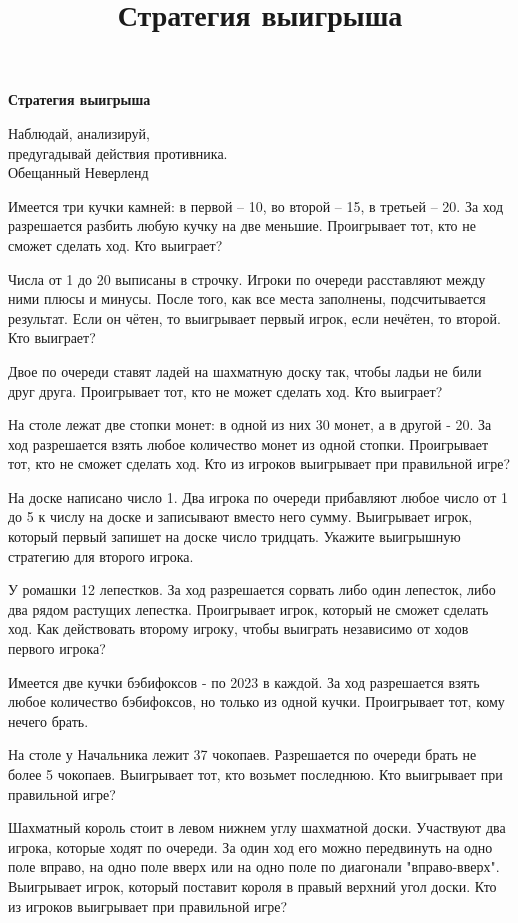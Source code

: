 \centerline{\bf \Huge Стратегия выигрыша}
\title{Стратегия выигрыша}

\begin{flushright}
    \scriptsize Наблюдай, анализируй,\\ предугадывай действия противника.\\
    Обещанный Неверленд
\end{flushright}

Имеется три кучки камней: в первой – 10, во второй – 15, в третьей – 20. За ход разрешается разбить любую кучку на две меньшие. Проигрывает тот, кто не сможет сделать ход. Кто выиграет?

Числа от 1 до 20 выписаны в строчку. Игроки по очереди расставляют между ними плюсы и минусы. После того, как все места заполнены, подсчитывается результат. Если он чётен, то выигрывает первый игрок, если нечётен, то второй. Кто выиграет?

 Двое по очереди ставят ладей на шахматную доску так, чтобы ладьи не били друг друга. Проигрывает тот, кто не может сделать ход. Кто выиграет?

 На столе лежат две стопки монет: в одной из них 30 монет, а в другой - 20. За ход разрешается взять любое количество монет из одной стопки. Проигрывает тот, кто не сможет сделать ход. Кто из игроков выигрывает при правильной игре?

На доске написано число 1. Два игрока по очереди прибавляют любое число от 1 до 5 к числу на доске и записывают вместо него сумму. Выигрывает игрок, который первый запишет на доске число тридцать. Укажите выигрышную стратегию для второго игрока.

 У ромашки 12 лепестков. За ход разрешается сорвать либо один лепесток, либо два рядом растущих лепестка. Проигрывает игрок, который не сможет сделать ход. Как действовать второму игроку, чтобы выиграть независимо от ходов первого игрока?

Имеется две кучки бэбифоксов - по 2023 в каждой. За ход разрешается взять любое количество бэбифоксов, но только из одной кучки. Проигрывает тот, кому нечего брать.

На столе у Начальника лежит 37 чокопаев. Разрешается по очереди брать не более 5 чокопаев. Выигрывает тот, кто возьмет последнюю. Кто выигрывает при правильной игре?

\newpage

Шахматный король стоит в левом нижнем углу шахматной доски. Участвуют два игрока, которые ходят по очереди. За один ход его можно передвинуть на одно поле вправо, на одно поле вверх или на одно поле по диагонали "вправо-вверх". Выигрывает игрок, который поставит короля в правый верхний угол доски. Кто из игроков выигрывает при правильной игре?

